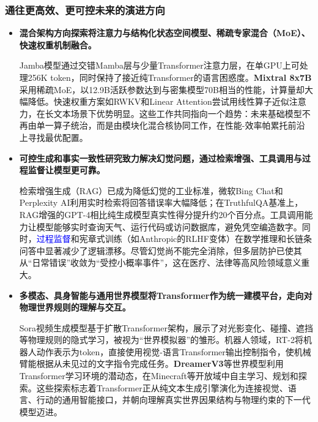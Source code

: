 \documentclass[11pt]{beamer}
\begin{document}
\begin{frame}
\frametitle{通往更高效、更可控未来的演进方向}

\begin{itemize}
  \item \textbf{混合架构方向探索将注意力与结构化状态空间模型、稀疏专家混合（MoE）、快速权重机制融合。}
  
  Jamba模型通过交错Mamba层与少量Transformer注意力层，在单GPU上可处理256K token，同时保持了接近纯Transformer的语言困惑度。\textbf{Mixtral 8x7B}采用稀疏MoE，以12.9B活跃参数达到与密集模型70B相当的性能，计算量却大幅降低。快速权重方案如RWKV和Linear Attention尝试用线性算子近似注意力，在长文本场景下优势明显。这些工作共同指向一个趋势：未来基础模型不再由单一算子统治，而是由\alert{模块化混合核}协同工作，在性能-效率帕累托前沿上寻找最优配置。

  \item \textbf{可控生成和事实一致性研究致力解决幻觉问题，通过检索增强、工具调用与过程监督让模型更可靠。}
  
  检索增强生成（RAG）已成为\alert{降低幻觉}的工业标准，微软Bing Chat和Perplexity AI利用实时检索将回答错误率大幅降低；在TruthfulQA基准上，RAG增强的GPT-4相比纯生成模型真实性得分提升约20个百分点。工具调用能力让模型能够实时查询天气、运行代码或访问数据库，避免凭空编造数字。同时，\textcolor{blue}{过程监督}和宪章式训练（如Anthropic的RLHF变体）在数学推理和长链条问答中显著减少了逻辑漂移。尽管幻觉尚不能完全消除，但多层防护已使其从“日常错误”收敛为“受控小概率事件”，这在医疗、法律等高风险领域意义重大。

  \item \textbf{多模态、具身智能与通用世界模型将Transformer作为统一建模平台，走向对物理世界规则的理解与交互。}
  
  Sora视频生成模型基于扩散Transformer架构，展示了对光影变化、碰撞、遮挡等物理规则的隐式学习，被视为“世界模拟器”的雏形。机器人领域，\alert{RT-2}将机器人动作表示为token，直接使用视觉-语言Transformer输出控制指令，使机械臂能根据从未见过的文字指令完成任务。\textbf{DreamerV3}等世界模型利用Transformer学习环境的潜动态，在Minecraft等开放域中自主学习、规划和探索。这些探索标志着Transformer正从纯文本生成引擎演化为连接视觉、语言、行动的\alert{通用智能接口}，并朝向理解真实世界因果结构与物理约束的下一代模型迈进。
\end{itemize}
\end{frame}
\end{document}
